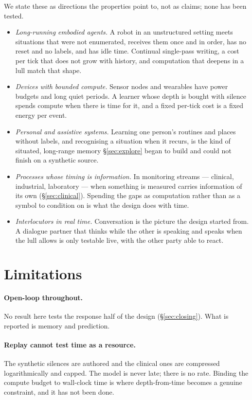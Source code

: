 \documentclass[11pt,a4paper]{article}
\theoremstyle{plain}
\theoremstyle{definition}
\theoremstyle{remark}
\begin{document}
We state these as directions the properties point to, not as claims; none has
been tested.
\begin{itemize}
\item \emph{Long-running embodied agents.} A robot in an unstructured setting
meets situations that were not enumerated, receives them once and in order, has
no reset and no labels, and has idle time. Continual single-pass writing, a cost
per tick that does not grow with history, and computation that deepens in a
lull match that shape.
\item \emph{Devices with bounded compute.} Sensor nodes and wearables have
power budgets and long quiet periods. A learner whose depth is bought with
silence spends compute when there is time for it, and a fixed per-tick cost is
a fixed energy per event.
\item \emph{Personal and assistive systems.} Learning one person's routines and
places without labels, and recognising a situation when it recurs, is the kind
of situated, long-range memory \S\ref{sec:explore} began to build and could not
finish on a synthetic source.
\item \emph{Processes whose timing is information.} In monitoring streams ---
clinical, industrial, laboratory --- when something is measured carries
information of its own (\S\ref{sec:clinical}). Spending the gaps as computation
rather than as a symbol to condition on is what the design does with time.
\item \emph{Interlocutors in real time.} Conversation is the picture the design
started from. A dialogue partner that thinks while the other is speaking and
speaks when the lull allows is only testable live, with the other party able to
react.
\end{itemize}

\section{Limitations}
\label{sec:limits}

\paragraph{Open-loop throughout.} No result here tests the response half of the
design (\S\ref{sec:closing}). What is reported is memory and prediction.

\paragraph{Replay cannot test time as a resource.} The synthetic silences are
authored and the clinical ones are compressed logarithmically and capped. The
model is never late; there is no rate. Binding the compute budget to wall-clock
time is where depth-from-time becomes a genuine constraint, and it has not been
done.
\end{document}
